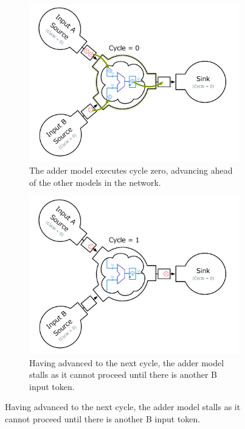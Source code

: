\begin{figure}
    \begin{subfigure}[t]{0.45\textwidth}
	    \centering
        \includegraphics[width=\linewidth]{figures/adder-ex1.pdf}
        \caption{The adder model executes cycle zero, advancing ahead of the other models
        in the network.}
    \end{subfigure}
    \begin{subfigure}[t]{0.45\textwidth}
	    \centering
        \includegraphics[width=\linewidth]{figures/adder-ex2.pdf}
        \caption{Having advanced to the next cycle, the adder model stalls as
        it cannot proceed until there is another B input token.}
    \end{subfigure}

\end{figure}
